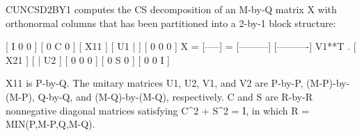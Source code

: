 \begin{DoxyVerb} CUNCSD2BY1 computes the CS decomposition of an M-by-Q matrix X with
 orthonormal columns that has been partitioned into a 2-by-1 block
 structure:

                                [  I  0  0 ]
                                [  0  C  0 ]
          [ X11 ]   [ U1 |    ] [  0  0  0 ]
      X = [-----] = [---------] [----------] V1**T .
          [ X21 ]   [    | U2 ] [  0  0  0 ]
                                [  0  S  0 ]
                                [  0  0  I ]
 
 X11 is P-by-Q. The unitary matrices U1, U2, V1, and V2 are P-by-P,
 (M-P)-by-(M-P), Q-by-Q, and (M-Q)-by-(M-Q), respectively. C and S are
 R-by-R nonnegative diagonal matrices satisfying C^2 + S^2 = I, in
 which R = MIN(P,M-P,Q,M-Q).\end{DoxyVerb}
 
